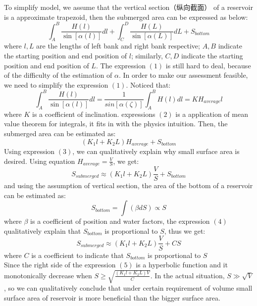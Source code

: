 \documentclass[nocover]{cumcmart}
\begin{document}
To simplify model, we assume that the vertical section（纵向截面） of a reservoir is a approximate trapezoid, then the submerged area can be expressed as below:
\begin{equation}\int_{A}^{B}\frac{H\left(l\right)}{\sin\left[\alpha\left(l\right)\right]}dl + \int_{C}^{D}\frac{H\left(L\right)}{\sin\left[\alpha\left(L\right)\right]}dL + S_{bottom}\end{equation}
where $l, L$ are the lengths of left bank and right bank respective; $A, B$ indicate the starting position and end position of $l$; similarly, $C, D$ indicate the starting position and end position of $L$.
The expression $\left(1\right)$ is still hard to deal, because of the difficulty of the estimation of $\alpha$. In order to make our assessment feasible, we need to simplify the expression $\left(1\right)$. Noticed that:
\begin{equation}
\int_{A}^{B}\frac{H\left(l\right)}{\sin\left[\alpha\left(l\right)\right]}dl = \frac{1}{sin\left[\alpha\left(\zeta\right)\right]}\int_{A}^{B}H\left(l\right)dl
= KH_{average}l
\end{equation}
where $K$ is a coefficient of inclination. expressions $\left(2\right)$ is a application of mean value theorem for integrals, it fits in with the physics intuition. Then, the submerged area can be estimated as:
\begin{equation}
\left(K_{1}l + K_{2}L\right)H_{average} + S_{bottom}
\end{equation}
Using expression $\left(3\right)$, we can qualitatively explain why small surface area is desired. Using equation $H_{average} = \frac{V}{S}$, we get:
\[S_{submerged} \approx \left(K_{1}l + K_{2}L\right)\frac{V}{S} + S_{bottom}\]
and using the assumption of vertical section, the area of the bottom of a reservoir can be estimated as:
\begin{equation}
S_{bottom} = \int\left(\beta dS \right) \propto S
\end{equation}  
where $\beta$ is a coefficient of position and water factors, the expression $\left(4\right)$ qualitatively explain that $S_{bottom}$ is proportional to $S$, thus we get:
\begin{equation}
S_{submerged} \approx \left(K_{1}l + K_{2}L\right)\frac{V}{S} + CS
\end{equation}
where $C$ is a coefficient to indicate that $S_{bottom}$ is proportional to $S$\\
Since the right side of the expression $\left(5\right)$ is a hyperbolic function and it monotonically decrease when $S \geq \sqrt{\frac{\left(K_{1}l + K_{2}L\right)V}{C}}$. In the actual situation, $S \gg \sqrt{V}$, so we can qualitatively conclude that under certain requirement of volume small surface area of reservoir is more beneficial than the bigger surface area.
\end{document}
